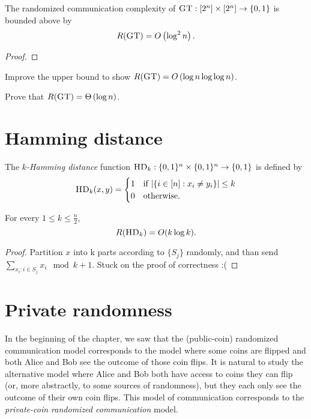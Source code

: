 \begin{theorem}
The randomized communication complexity of $\textsc{GT} : [2^n] \times [2^n] \to \{0,1\}$ is bounded above by
\[
R(\textsc{GT}) = O\left(\log^2 n \right).
\]
\end{theorem}

\begin{proof}
\end{proof}

\exercises

\begin{exercise}
Improve the upper bound to show $R(\textsc{GT}) = O\left(\log n \log \log n \right)$.
\end{exercise}

\begin{exercise}
Prove that $R(\textsc{GT}) = \Theta\left(\log n \right)$.
\end{exercise}


\newpage 
\section{Hamming distance}

The \emph{$k$-Hamming distance} function $\textsc{HD}_k : \{0,1\}^n \times \{0,1\}^n \to \{0,1\}$ is defined by
\[
\textsc{HD}_k(x,y) = \begin{cases}
1 & \mbox{if } |\{i \in [n] : x_i \neq y_i\}| \le k \\
0 & \mbox{otherwise.}
\end{cases}
\]

\begin{theorem}
For every $1 \le k \le \frac n2$,
\[
R(\textsc{HD}_k) = O( k \log k).
\]
\end{theorem}

\begin{proof}
Partition $x$ into k parts according to $\{S_j\}$ randomly, and than send $\sum_{x_i:i\in S_j} x_i \mod k + 1$. Stuck on the proof of correctness :(
\end{proof}


\newpage 
\section{Private randomness}

In the beginning of the chapter, we saw that the (public-coin) randomized communication model corresponds to the model where some coins are flipped and both Alice and Bob see the outcome of those coin flips. It is natural to study the alternative model where Alice and Bob both have access to coins they can flip (or, more abstractly, to some sources of randomness), but they each only see the outcome of their own coin flips. This model of communication corresponds to the \emph{private-coin randomized communication} model.

